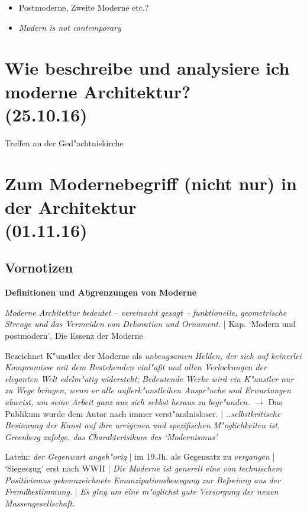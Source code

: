 \documentclass[emulatestandardclasses]{scrartcl}
\begin{document}
\begin{itemize}
    \item Postmoderne, Zweite Moderne etc.?
    \item \emph{Modern is not contemporary}
\end{itemize}

\section{Wie beschreibe und analysiere ich moderne Architektur?\\(25.10.16)}

Treffen an der Ged"achtniskirche


\section{Zum Modernebegriff (nicht nur) in der Architektur\\(01.11.16)}

\subsection{Vornotizen}
\textbf{Definitionen und Abgrenzungen von Moderne}

\begin{description}[leftmargin=!,labelwidth=\widthof{\bfseries P2}]
  \item[Greenberg (Arch.)] \emph{Moderne Architektur bedeutet -- vereinacht gesagt -- funktionelle, geometrische Strenge und das Vermeiden von Dekoration und Ornament.} | Kap. `Modern und postmodern', Die Essenz der Moderne 
  \item[Greenberg (Kunst)] Bezeichnet K"unstler der Moderne als \emph{unbeugsamen Helden, der sich auf keinerlei Kompromisse mit dem Bestehenden einl"a\ss t und allen Verlockungen der eleganten Welt edelm"utig widersteht}; \emph{Bedeutende Werke wird ein K"unstler nur zu Wege bringen, wenn er alle au\ss erk"unstlcihen Anspr"uche und Erwartungen abweist, um seine Arbeit ganz aus sich sekbst heraus zu begr"unden.} $\rightarrow$ Das Publikum wurde dem Autor nach immer verst"andnisloser. | \emph{..selbstkritische Besinnung der Kunst auf ihre ureigenen und spezifischen M"oglichkeiten ist, Greenberg zufolge, das Charakterisikum des `Modernismus' }
  
  \item[Kretschmer] Latein: \emph{der Gegenwart angeh"orig} | im 19.Jh. als Gegensatz zu \emph{vergangen} | `Siegeszug' erst nach WWII | \emph{Die Moderne ist generell eine von technischem Positivismus gekennzeichnete Emanzipationsbewegung zur Befreiung aus der Fremdbestimmung.} | \emph{Es ging um eine m"oglichst gute Versorgung der neuen Massengesellschaft.} 
\end{description}
\end{document}
